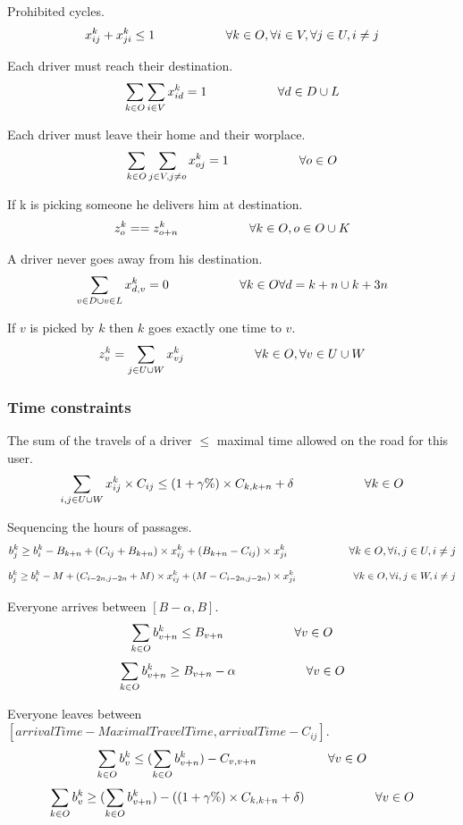 \documentclass[12pt, a4paper,twoside]{memoir}
\newcommand\tab[1][1cm]{\hspace*{#1}}
\begin{document}
	Prohibited cycles.
	\[ x^{k}_{ij}+x^{k}_{ji}\leq1\tab \tab \forall k\in O,\forall i\in V,\forall j\in U,i\ne j \]
	
	Each driver must reach their destination.
	\[ \sum_{\substack{k\in O}}\sum_{\substack{i \in V}} x^{k}_{id}=1 \tab \tab \forall d\in D\cup L \]
	
	Each driver must leave their home and their worplace. 
	\[ \sum_{\substack{k\in O}}\sum_{\substack{j \in V,j\ne o}} x^{k}_{oj}=1\tab \tab \forall o\in O \]

	If k is picking someone he delivers him at destination.
	\[ z^{k}_{o}==z^{k}_{o+n}\tab \tab \forall k\in O, o\in O\cup K \] 
	
	A driver never goes away from his destination.
	\[ \sum_{\substack{v\in D\cup v\in L}} x^{k}_{d,v}=0\tab \tab \forall k\in O \forall d=k+n\cup k+3n\]
	
	If $v$ is picked by $k$ then $k$ goes exactly one time to $v$.
	\[ z^{k}_{v}=\sum_{\substack{j\in U\cup W}} x^{k}_{vj} \tab \tab \forall k\in O,\forall v\in U\cup W \]
	
	\subsubsection{Time constraints}
	
	The sum of the travels of a driver $\leq$ maximal time allowed on the road for this user.
	\[ \sum_{\substack{i,j\in U\cup W}}x^{k}_{ij}\times C_{ij}\leq (1+\gamma \% )\times C_{k,k+n}+\delta \tab \tab \forall k\in O \]
	
	Sequencing the hours of passages.
	\[ b^{k}_{j}\geq b^{k}_{i}-B_{k+n}+(C_{ij}+B_{k+n})\times x^{k}_{ij}+(B_{k+n}-C_{ij})\times x^{k}_{ji}\tab \tab \forall k\in O,\forall i,j\in U,i\neq j \]
	\[ b^{k}_{j}\geq b^{k}_{i}-M+(C_{i-2n,j-2n}+M)\times x^{k}_{ij}+(M-C_{i-2n,j-2n})\times x^{k}_{ji}\tab \tab \forall k\in O,\forall i,j\in W,i\neq j \]
	
	Everyone arrives between $[B-\alpha ,B]$.
	\[ \sum_{\substack{k\in O}}b^{k}_{v+n}\leq B_{v+n} \tab \tab \forall v\in O \]
	\[ \sum_{\substack{k\in O}}b^{k}_{v+n}\geq B_{v+n} - \alpha \tab \tab \forall v\in O \]
	
	Everyone leaves between $[arrival Time-MaximalTravelTime ,arrival Time - C_{ij}]$.
	\[ \sum_{\substack{k\in O}}b^{k}_{v}\leq (\sum_{\substack{k\in O}} b^{k}_{v+n})- C_{v,v+n} \tab \tab \forall v\in O \]
	\[ \sum_{\substack{k\in O}}b^{k}_{v}\geq (\sum_{\substack{k\in O}} b^{k}_{v+n})- ((1+\gamma \% )\times C_{k,k+n}+\delta ) \tab \tab \forall v\in O \]
	
\end{document}
